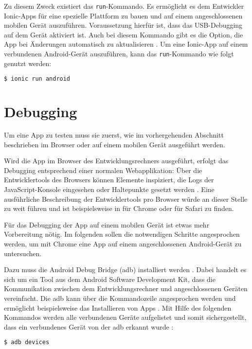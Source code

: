 Zu diesem Zweck existiert das \texttt{run}-Kommando. Es ermöglicht es dem Entwickler Ionic-Apps für eine spezielle Plattform zu bauen und auf einem angeschlossenen mobilen Gerät auszuführen. Voraussetzung hierfür ist, dass das USB-Debugging auf dem Gerät aktiviert ist. Auch bei diesem Kommando gibt es die Option, die App bei Änderungen automatisch zu aktualisieren \cite{ionic:run}. Um eine Ionic-App auf einem verbundenen Android-Gerät auszuführen, kann das \texttt{run}-Kommando wie folgt genutzt werden:
\begin{codebox}
\begin{lstlisting}[style=typescript]
$ ionic run android
\end{lstlisting}
\end{codebox}

\section{Debugging}

Um eine App zu testen muss sie zuerst, wie im vorhergehenden Abschnitt beschrieben im Browser oder auf einem mobilen Gerät ausgeführt werden. 

Wird die App im Browser des Entwicklungsrechners ausgeführt, erfolgt das Debugging entsprechend einer normalen Webapplikation: Über die Entwicklertools des Browsers können Elemente inspiziert, die Logs der JavaScript-Konsole eingesehen oder Haltepunkte gesetzt werden \cite{ionic:tips}. Eine ausführliche Beschreibung der Entwicklertools pro Browser würde an dieser Stelle zu weit führen und ist beispielsweise in \cite{google:chrome} für Chrome oder \cite{apple:safari} für Safari zu finden.

Für das Debugging der App auf einem mobilen Gerät ist etwas mehr Vorbereitung nötig. Im folgenden sollen die notwendigen Schritte angesprochen werden, um mit Chrome eine App auf einem angeschlossenen Android-Gerät zu untersuchen.

Dazu muss die Android Debug Bridge (adb) installiert werden \cite{ionic:tips}. Dabei handelt es sich um ein Tool aus dem Android Software Development Kit, dass die Kommunikation zwischen dem Entwicklungsrechner und angeschlossenen Geräten vereinfacht. Die adb kann über die Kommandozeile angesprochen werden und ermöglicht beispielsweise das Installieren von Apps \cite{google:adb}. Mit Hilfe des folgenden Kommandos werden alle verbundenen Geräte aufgelistet und somit sichergestellt, dass ein verbundenes Gerät von der adb erkannt wurde \cite{ionic:tips}:
\begin{codebox}
\begin{lstlisting}[style=typescript]
$ adb devices
\end{lstlisting}
\end{codebox}

